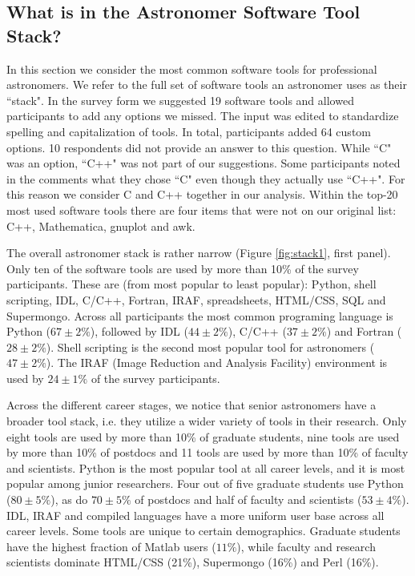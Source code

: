 
\subsection{What is in the Astronomer Software Tool Stack?}

In this section we consider the most common software tools for professional astronomers. We refer to the full set of software tools an astronomer uses as their ``stack". In the survey form we suggested 19 software tools and allowed participants to add any options we missed. The input was edited to standardize spelling and capitalization of tools. In total, participants added 64 custom options. 10 respondents did not provide an answer to this question. While ``C" was an option, ``C++" was not part of our suggestions. Some participants noted in the comments what they chose ``C" even though they actually use ``C++". For this reason we consider C and C++ together in our analysis. Within the top-20 most used software tools there are four items that were not on our original list: C++, Mathematica, gnuplot and awk.

The overall astronomer stack is rather narrow (Figure \ref{fig:stack1}, first panel). Only ten of the software tools are used by more than 10\% of the survey participants. These are (from most popular to least popular): Python, shell scripting, IDL, C/C++, Fortran, IRAF, spreadsheets, HTML/CSS, SQL and Supermongo. Across all participants the most common programing language is Python ($67\pm2\%$), followed by IDL ($44\pm2\%$), C/C++ ($37\pm2\%$) and Fortran ($28\pm2\%$). Shell scripting is the second most popular tool for astronomers ($47\pm2\%$).  The IRAF (Image Reduction and Analysis Facility) environment is used by $24\pm1\%$ of the survey participants. 

Across the different career stages, we notice that senior astronomers have a broader tool stack, i.e. they utilize a wider variety of tools in their research. Only eight tools are used by more than 10\% of graduate students, nine tools are used by more than 10\% of postdocs and 11 tools are used by more than 10\% of faculty and scientists. Python is the most popular tool at all career levels, and it is most popular among junior researchers. Four out of five graduate students use Python ($80\pm5\%$), as do $70\pm5\%$ of postdocs and half of faculty and scientists ($53\pm4\%$). IDL, IRAF and compiled languages have a more uniform user base across all career levels. Some tools are unique to certain demographics. Graduate students have the highest fraction of Matlab users ($11\%$), while faculty and research scientists dominate HTML/CSS (21\%), Supermongo (16\%) and Perl (16\%).


